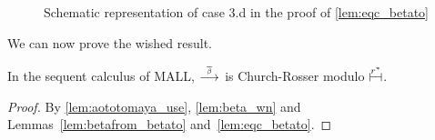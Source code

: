 \documentclass{lmcs}
\newcommand{\emptyforproof}{{\scriptsize\phantom{x}}}
\newenvironment{myscope}{
\begin{scope}[every node/.style={circle,thick,draw,minimum size=8mm,inner sep=0}, every edge/.style={->,draw=black,thick}, every path/.style={-,draw=black,thick}]
}{
\end{scope}
}
\newenvironment{myscopec}[1]{
\begin{scope}[every node/.style={circle,thick,draw=#1,minimum size=8mm,inner sep=0}, every edge/.style={->,draw=#1,thick}, every path/.style={draw=#1, thick}]
\color{#1}
}{
\end{scope}
}
\newcommand{\edgelabel}[1]{edge node[draw=none, sloped, align=center]{#1 \\}}
\newcommand{\edgelabeld}[1]{edge[-] node[draw=none, sloped, align=center]{#1 \\}}
\newcommand{\symboltext}[2]{\mathrel{\overset{\makebox[0pt]{\mbox{\normalfont\tiny\sffamily \ensuremath{#1}}}}{#2}}} %
\newcommand{\betabar}{\overline{\beta}}
\newcommand{\betabarto}{\symboltext{\betabar}{\longrightarrow}}
\newcommand{\vdashv}{\mathrel{\lower .22ex \hbox{$\vdash\!\dashv$}}}
\DeclareRobustCommand{\astsymbol}[1]{\mathrel{\ooalign{{$\vdashv$}\crcr{$\stackrel{#1}{\hphantom{\vdashv}\vphantom{\to}}$}}}}
\newcommand{\eqcone}{\astsymbol{r}} %
\newcommand{\eqc}{\astsymbol{r^\ast}} %
\begin{document}
\begin{figure}
\begin{adjustbox}{}
\end{adjustbox}
\caption{Schematic representation of case 3.d in the proof of \autoref{lem:eqc_betato}}
\label{fig:proof_eqcone_betabarto_3d}
\end{figure}

We can now prove the wished result.

\begin{prop}
\label{th:CReqc}
In the sequent calculus of MALL, $\betabarto$ is Church-Rosser modulo $\eqc$.
\end{prop}
\begin{proof}
By \autoref{lem:aototomaya_use}, \autoref{lem:beta_wn} and Lemmas~\ref{lem:betafrom_betato} and~\ref{lem:eqc_betato}.
\end{proof}
\end{document}
